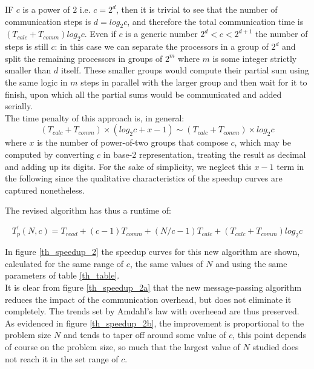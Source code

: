 \documentclass{article}
\begin{document}
IF $c$ is a power of $2$ i.e. $c=2^d$, then it is trivial to see that the number of communication steps is $d=log_2 c$, and therefore the total communication time is $\left( T_{calc} + T_{comm} \right)log_2 c$. Even if $c$ is a generic number $2^d < c < 2^{d+1}$ the number of steps is still $c$: in this case we can separate the processors in a group of $2^d$ and split the remaining processors in groups of $2^m$ where $m$ is some integer strictly smaller than $d$ itself. These smaller groups would compute their partial sum using the same logic in $m$ steps in parallel with the larger group and then wait for it to finish, upon which all the partial sums would be communicated and added serially.\\
The time penalty of this approach is, in general:
\begin{equation}
\left( T_{calc} + T_{comm} \right)\times \left( log_2 c + x - 1\right) \sim \left( T_{calc} + T_{comm} \right)\times  log_2 c
\end{equation}
where $x$ is the number of power-of-two groups that compose $c$, which may be computed by converting $c$ in base-2 representation, treating the result as decimal and adding up its digits. For the sake of simplicity, we neglect this $x-1$ term in the following since the qualitative characteristics of the speedup curves are captured nonetheless.

The revised algorithm has thus a runtime of:

\begin{equation}
T_p ^\prime \left( N, c \right) = T_{read} + \left( c - 1 \right)T_{comm}  +  \left( N/c -1 \right)T_{calc} + \left( T_{calc} + T_{comm} \right) log_2 c
\end{equation}

In figure \ref{th_speedup_2} the speedup curves for this new algorithm are shown, calculated for the same range of $c$, the same values of $N$ and using the same parameters of table \ref{th_table}. \\
It is clear from figure \ref{th_speedup_2a} that the new message-passing algorithm reduces the impact of the communication overhead, but does not eliminate it completely. The trends set by Amdahl's law with overheead are thus preserved. As evidenced in figure \ref{th_speedup_2b}, the improvement is proportional to the problem size $N$ and tends to taper off around some value of $c$, this point depends of course on the problem size, so much that the largest value of $N$ studied does not reach it in the set range of $c$.
\end{document}

